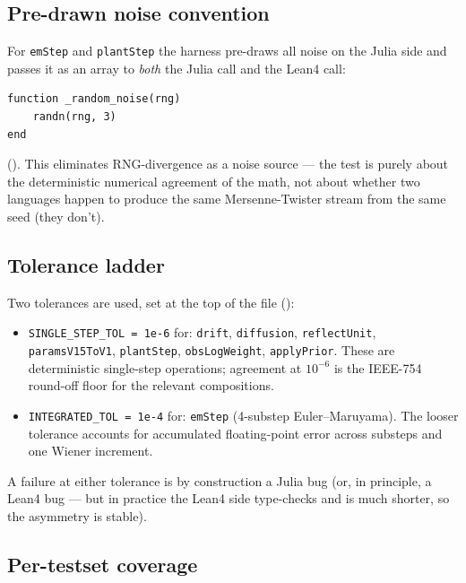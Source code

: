 \documentclass[11pt,a4paper]{article}
\begin{document}
\subsection{Pre-drawn noise convention}

For \texttt{emStep} and \texttt{plantStep} the harness pre-draws all
noise on the Julia side and passes it as an array to \emph{both} the
Julia call and the Lean4 call:

\begin{lstlisting}
function _random_noise(rng)
    randn(rng, 3)
end
\end{lstlisting}

\noindent (). This eliminates
RNG-divergence as a noise source --- the test is purely about the
deterministic numerical agreement of the math, not about whether two
languages happen to produce the same Mersenne-Twister stream from the
same seed (they don't).

\subsection{Tolerance ladder}

Two tolerances are used, set at the top of the file
():

\begin{itemize}[itemsep=2pt]
  \item \texttt{SINGLE\_STEP\_TOL = 1e-6} for: \texttt{drift},
        \texttt{diffusion}, \texttt{reflectUnit}, \texttt{paramsV15ToV1},
        \texttt{plantStep}, \texttt{obsLogWeight}, \texttt{applyPrior}.
        These are deterministic single-step operations; agreement at
        $10^{-6}$ is the IEEE-754 round-off floor for the
        relevant compositions.
  \item \texttt{INTEGRATED\_TOL = 1e-4} for: \texttt{emStep} (4-substep
        Euler--Maruyama). The looser tolerance accounts for accumulated
        floating-point error across substeps and one Wiener increment.
\end{itemize}

A failure at either tolerance is by construction a Julia bug
(or, in principle, a Lean4 bug --- but in practice the Lean4 side
type-checks and is much shorter, so the asymmetry is stable).

\subsection{Per-testset coverage}
\end{document}
